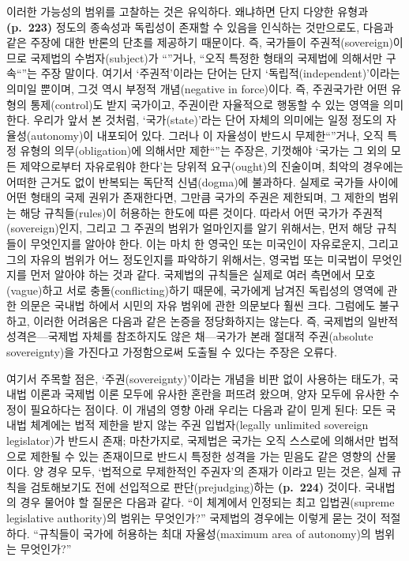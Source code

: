 이러한 가능성의 범위를 고찰하는 것은 유익하다. 왜냐하면 단지 다양한
유형과 \textbf{(p.~223)} 정도의 종속성과 독립성이 존재할 수 있음을
인식하는 것만으로도, 다음과 같은 주장에 대한 반론의 단초를 제공하기
때문이다. 즉, 국가들이 주권적(sovereign)이므로 국제법의
수범자(subject)가 ``''거나, ``오직 특정한
형태의 국제법에 의해서만 구속``''는 주장 말이다.
여기서 `주권적'이라는 단어는 단지 `독립적(independent)'이라는 의미일
뿐이며, 그것 역시 부정적 개념(negative in force)이다. 즉, 주권국가란
어떤 유형의 통제(control)도 받지  국가이고, 주권이란
자율적으로 행동할 수 있는 영역을 의미한다. 우리가 앞서 본 것처럼,
`국가(state)'라는 단어 자체의 의미에는 일정 정도의 자율성(autonomy)이
내포되어 있다. 그러나 이 자율성이 반드시 무제한``''거나, 오직 특정 유형의 의무(obligation)에 의해서만
제한``''는 주장은, 기껏해야 `국가는 그 외의 모든
제약으로부터 자유로워야 한다'는 당위적 요구(ought)의 진술이며, 최악의
경우에는 어떠한 근거도 없이 반복되는 독단적 신념(dogma)에 불과하다.
실제로 국가들 사이에 어떤 형태의 국제 권위가 존재한다면, 그만큼 국가의
주권은 제한되며, 그 제한의 범위는 해당 규칙들(rules)이 허용하는 한도에
따른 것이다. 따라서 어떤 국가가 주권적(sovereign)인지, 그리고 그 주권의
범위가 얼마인지를 알기 위해서는, 먼저 해당 규칙들이 무엇인지를 알아야
한다. 이는 마치 한 영국인 또는 미국인이 자유로운지, 그리고 그의 자유의
범위가 어느 정도인지를 파악하기 위해서는, 영국법 또는 미국법이
무엇인지를 먼저 알아야 하는 것과 같다. 국제법의 규칙들은 실제로 여러
측면에서 모호(vague)하고 서로 충돌(conflicting)하기 때문에, 국가에게
남겨진 독립성의 영역에 관한 의문은 국내법 하에서 시민의 자유 범위에 관한
의문보다 훨씬 크다. 그럼에도 불구하고, 이러한 어려움은 다음과 같은
 논증을 정당화하지는 않는다. 즉, 국제법의 일반적
성격은---국제법 자체를 참조하지도 않은 채---국가가 본래 절대적
주권(absolute sovereignty)을 가진다고 가정함으로써 도출될 수 있다는
주장은 오류다.

여기서 주목할 점은, `주권(sovereignty)'이라는 개념을 비판 없이 사용하는
태도가, 국내법 이론과 국제법 이론 모두에 유사한 혼란을 퍼뜨려 왔으며,
양자 모두에 유사한 수정이 필요하다는 점이다. 이 개념의 영향 아래 우리는
다음과 같이 믿게 된다: 모든 국내법 체계에는 법적 제한을 받지 않는 주권
입법자(legally unlimited sovereign legislator)가 반드시 존재; 마찬가지로, 국제법은 국가는 오직 스스로에 의해서만 법적으로
제한될 수 있는 존재이므로 반드시 특정한 성격을 가는 믿음도 같은 영향의 산물이다. 양 경우 모두, `법적으로
무제한적인 주권자'의 존재가 이라고 믿는 것은, 실제 규칙을
검토해보기도 전에 선입적으로 판단(prejudging)하는 \textbf{(p.~224)}
것이다. 국내법의 경우 물어야 할 질문은 다음과 같다. ``이 체계에서
인정되는 최고 입법권(supreme legislative authority)의 범위는 무엇인가?''
국제법의 경우에는 이렇게 묻는 것이 적절하다. ``규칙들이 국가에 허용하는
최대 자율성(maximum area of autonomy)의 범위는 무엇인가?''


